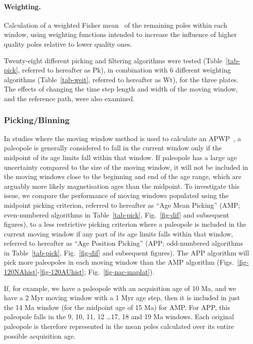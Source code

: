 \paragraph{Weighting.} Calculation of a weighted Fisher mean~\citep{F53} of
the remaining poles within each window, using weighting functions intended to
increase the influence of higher quality poles relative to lower quality ones.

\bigskip
Twenty-eight different picking and filtering algorithms were tested
(Table~\ref{tab-pick}, referred to hereafter as Pk), in combination with 6
different weighting algorithms (Table~\ref{tab-weit}, referred to hereafter as
Wt), for the three plates. The effects of changing the time step length and
width of the moving window, and the reference path, were also examined.

\subsubsection{Picking/Binning}\label{sec:p}

In studies where the moving window method is used to calculate an
APWP~\citep{T99,T08}, a paleopole is generally considered to fall in the current
window only if the midpoint of its age limits fall within that window. If
paleopole has a large age uncertainty compared to the size of the moving window,
it will not be included in the moving windows close to the beginning and end of
the age range, which are arguably more likely magnetisation ages than the
midpoint. To investigate this issue, we compare the performance of moving
windows populated using the midpoint picking criterion, referred to hereafter
as ``Age Mean Picking'' (AMP\@; even-numbered algorithms in
Table~\ref{tab-pick}, Fig.~\ref{fig-dif} and subsequent figures), to a less
restrictive picking criterion where a paleopole is included in the current
moving window if any part of its age limits falls within that window, referred
to hereafter as ``Age Position Picking'' (APP\@; odd-numbered algorithms in
Table~\ref{tab-pick}, Fig.~\ref{fig-dif} and subsequent figures). The APP
algorithm will pick more paleopoles in each moving window than the AMP algorithm
(Figs.~\ref{fig-120NAhist}-\ref{fig-120AUhist}; Fig.~\ref{fig-nac-maplat}).

If, for example, we have a paleopole with an acquisition age of 10
Ma, and we have a 2 Myr moving window with a 1 Myr age step, then it is included
in just the 14 Ma window (for the midpoint age of 15 Ma) for
AMP\@. For APP, this paleopole falls in the 9, 10,
11, 12 \ldots 17, 18 and
19 Ma windows. Each original paleopole is therefore represented in
the mean poles calculated over its entire possible acquisition age.

